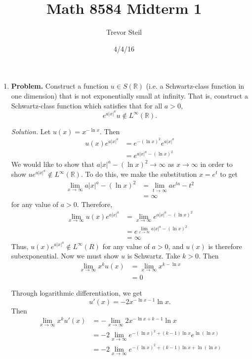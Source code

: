 \documentclass[a4paper]{article}
\title{Math 8584 Midterm 1 }
\date{4/4/16}
\author{Trevor Steil}
\newenvironment{solution}{\emph{Solution.}}{}
\newenvironment{problem}{\textbf{Problem.}}{}
\newcommand{\R}{\mathbb{R}}
\begin{document}
\maketitle

\begin{enumerate}
  \item
    \begin{problem}
      Construct a function $u \in S(\R)$ (i.e. a Schwartz-class function in one dimension) that is not exponentially small at infinity.
      That is, construct a Schwartz-class function which satisfies that for all $a > 0$,
      \[ e^{a |x|^a} u \not \in L^\infty(\R) .\]
    \end{problem}

    \begin{solution}
      Let $u(x) = x^{- \ln x}$. Then
      \begin{align*}
        u(x) e^{a |x|^a} &= e^{-(\ln x)^2} e^{a |x|^a} \\
        &= e^{a |x|^a - (\ln x)^2}
      \end{align*}
      We would like to show that $a |x|^a - (\ln x)^2 \to \infty$ as $x \to \infty$ in order to show $u e^{a |x|^a} \not\in L^\infty(\R)$.
      To do this, we make the substitution $x = e^t$ to get
      \begin{align*}
        \lim_{x \to \infty} a |x|^a - (\ln x)^2 &= \lim_{t \to \infty} a e^{ta} - t^2 \\
        &= \infty
      \end{align*}
      for any value of $a > 0$. Therefore,
      \begin{align*}
        \lim_{x \to \infty} u(x) e^{a |x|^a} &= \lim_{x \to \infty} e^{a |x|^a - (\ln x)^2} \\
        &= e^{ \lim_{x \to \infty}  a|x|^a - (\ln x)^2} \\
        &= \infty
      \end{align*}
      Thus, $u(x) e^{a|x|^a} \not\in L^{\infty}(R)$ for any value of $a > 0$, and $u(x)$ is therefore subexponential. Now we must show $u$ is Schwartz.
      Take $k > 0$. Then
      \begin{align*}
        \lim_{x \to \infty} x^k u(x) &= \lim_{x \to \infty} x^{k - \ln x} \\
        &= 0
      \end{align*}

      Through logarithmic differentiation, we get
      \[ u'(x) = -2 x^{-\ln x - 1} \ln x.\]
      Then
      \begin{align*}
        \lim_{x \to \infty} x^k u'(x) &= - \lim_{x \to \infty} 2 x^{-\ln x + k -1} \ln x \\
        &= -2 \lim_{x \to \infty} e^{- (\ln x)^2 + (k -1)\ln x} e^{\ln(\ln x)} \\
        &= -2 \lim_{x \to \infty} e^{-(\ln x)^2 + (k-1) \ln x + \ln( \ln x)}
      \end{align*}


\end{solution}
\end{enumerate}
\end{document}
